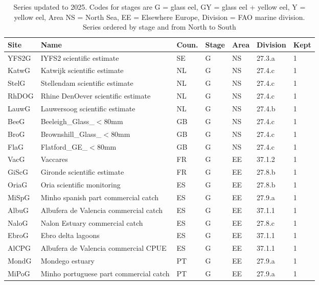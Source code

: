 \begin{table}[htbp]
\centering
\caption{Series updated to 2025. Codes for stages are G = glass eel, GY = glass eel + yellow eel, Y = yellow eel, Area NS = North Sea, EE = Elsewhere Europe, Division = FAO marine division. Series ordered by stage and from North to South} 
\label{table_seriesCY}
\begin{tabularx}{\textwidth}{p{1.3cm}p{6.5cm}p{1cm}p{1cm}p{1cm}p{1cm}p{1.4cm}}
  \hline
Site & Name & Coun. & Stage & Area & Division & Kept \\ 
  \hline
YFS2G & IYFS2 scientific estimate & SE & G & NS & 27.3.a &   1 \\ 
  KatwG & Katwijk scientific estimate & NL & G & NS & 27.4.c &   1 \\ 
  StelG & Stellendam scientific estimate & NL & G & NS & 27.4.c &   1 \\ 
  RhDOG & Rhine DenOever scientific estimate & NL & G & NS & 27.4.c &   1 \\ 
  LauwG & Lauwersoog scientific estimate & NL & G & NS & 27.4.b &   1 \\ 
  BeeG & Beeleigh\_Glass\_$<$80mm & GB & G & NS & 27.4.c &   1 \\ 
  BroG & Brownshill\_Glass\_$<$80mm & GB & G & NS & 27.4.c &   1 \\ 
  FlaG & Flatford\_GE\_$<$80mm & GB & G & NS & 27.4.c &   1 \\ 
  VacG & Vaccares & FR & G & EE & 37.1.2 &   1 \\ 
  GiScG & Gironde scientific estimate & FR & G & EE & 27.8.b &   1 \\ 
  OriaG & Oria scientific monitoring & ES & G & EE & 27.8.b &   1 \\ 
  MiSpG & Minho spanish part commercial catch & ES & G & EE & 27.9.a &   1 \\ 
  AlbuG & Albufera de Valencia commercial catch & ES & G & EE & 37.1.1 &   1 \\ 
  NaloG & Nalon Estuary commercial catch & ES & G & EE & 27.8.c &   1 \\ 
  EbroG & Ebro delta lagoons & ES & G & EE & 37.1.1 &   1 \\ 
  AlCPG & Albufera de Valencia commercial CPUE & ES & G & EE & 37.1.1 &   1 \\ 
  MondG & Mondego estuary & PT & G & EE & 27.9.a &   1 \\ 
  MiPoG & Minho portuguese part commercial catch & PT & G & EE & 27.9.a &   1 \\ 

\end{tabularx}
\end{table}
